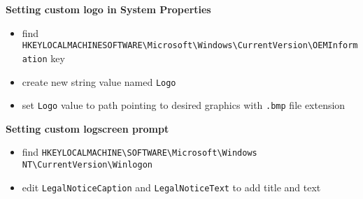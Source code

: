 \documentclass[11pt,a4paper]{article}
\def\bs{\textbackslash}
\def\us{\textunderscore}
\begin{document}
\textbf{Setting custom logo in System Properties }
\begin{itemize}
\item find \texttt{HKEY{\us}LOCAL{\us}MACHINE{\us}SOFTWARE{\bs}Microsoft{\bs}Windows{\bs}CurrentVersion{\bs}OEMInformation} key
\item create new string value named \texttt{Logo}
\item set \texttt{Logo} value to path pointing to desired graphics with \texttt{.bmp} file extension
\end{itemize}

\textbf{Setting custom logscreen prompt}
\begin{itemize}
\item find \texttt{HKEY{\us}LOCAL{\us}MACHINE{\bs}SOFTWARE{\bs}Microsoft{\bs}Windows NT{\bs}CurrentVersion{\bs}Winlogon}
\item edit \texttt{LegalNoticeCaption} and \texttt{LegalNoticeText} to add title and text
\end{itemize}
\end{document}
